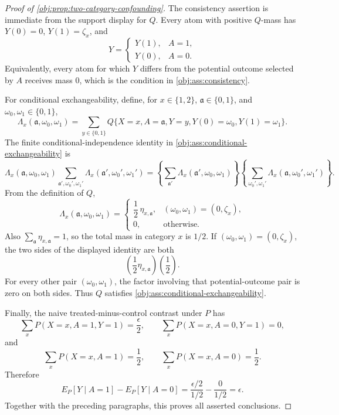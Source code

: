 \begin{proof}[Proof of \cref{obj:prop:two-category-confounding}]
The consistency assertion is immediate from the support display for \(Q\).  Every atom with positive \(Q\)-mass has \(Y(0)=0\), \(Y(1)=\zeta_x\), and
\[
Y=
\begin{cases}
Y(1),& A=1,\\
Y(0),& A=0.
\end{cases}
\]
Equivalently, every atom for which \(Y\) differs from the potential outcome selected by \(A\) receives mass \(0\), which is the condition in \cref{obj:ass:consistency}.

For conditional exchangeability, define, for \(x\in\{1,2\}\), \(\mathfrak a\in\{0,1\}\), and \(\omega_0,\omega_1\in\{0,1\}\),
\[
\Lambda_x(\mathfrak a,\omega_0,\omega_1)
=
\sum_{y\in\{0,1\}}
Q\{X=x,A=\mathfrak a,Y=y,Y(0)=\omega_0,Y(1)=\omega_1\}.
\]
The finite conditional-independence identity in \cref{obj:ass:conditional-exchangeability} is
\[
\Lambda_x(\mathfrak a,\omega_0,\omega_1)
\sum_{\mathfrak a',\omega_0',\omega_1'}
\Lambda_x(\mathfrak a',\omega_0',\omega_1')
=
\left\{\sum_{\mathfrak a'}\Lambda_x(\mathfrak a',\omega_0,\omega_1)\right\}
\left\{\sum_{\omega_0',\omega_1'}\Lambda_x(\mathfrak a,\omega_0',\omega_1')\right\}.
\]
From the definition of \(Q\),
\[
\Lambda_x(\mathfrak a,\omega_0,\omega_1)
=
\begin{cases}
\dfrac12\,\eta_{x,\mathfrak a},&(\omega_0,\omega_1)=(0,\zeta_x),\\[1ex]
0,&\text{otherwise.}
\end{cases}
\]
Also \(\sum_{\mathfrak a}\eta_{x,\mathfrak a}=1\), so the total mass in category \(x\) is \(1/2\).  If \((\omega_0,\omega_1)=(0,\zeta_x)\), the two sides of the displayed identity are both
\[
\left(\frac12\eta_{x,\mathfrak a}\right)\left(\frac12\right).
\]
For every other pair \((\omega_0,\omega_1)\), the factor involving that potential-outcome pair is zero on both sides.  Thus \(Q\) satisfies \cref{obj:ass:conditional-exchangeability}.

Finally, the naive treated-minus-control contrast under \(P\) has
\[
\sum_x P(X=x,A=1,Y=1)=\frac{\epsilon}{2},\qquad
\sum_x P(X=x,A=0,Y=1)=0,
\]
and
\[
\sum_x P(X=x,A=1)=\frac12,\qquad
\sum_x P(X=x,A=0)=\frac12.
\]
Therefore
\[
E_P[Y\mid A=1]-E_P[Y\mid A=0]
=
\frac{\epsilon/2}{1/2}-\frac{0}{1/2}
=
\epsilon .
\]
Together with the preceding paragraphs, this proves all asserted conclusions.
\end{proof}
